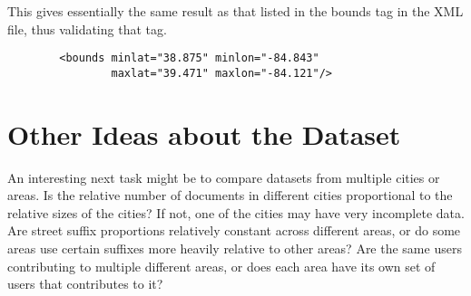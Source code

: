 \documentclass{article}
\begin{document}
        This gives essentially the same result as that listed in the bounds tag
        in the XML file, thus validating that tag.

        \begin{lstlisting}
        <bounds minlat="38.875" minlon="-84.843"
                maxlat="39.471" maxlon="-84.121"/>
        \end{lstlisting}

        
    \section{Other Ideas about the Dataset}
    An interesting next task might be to compare datasets from multiple cities
    or areas. Is the relative number of documents in different cities
    proportional to the relative sizes of the cities? If not, one of the cities
    may have very incomplete data. Are street suffix proportions relatively
    constant across different areas, or do some areas use certain suffixes more
    heavily relative to other areas? Are the same users contributing to multiple
    different areas, or does each area have its own set of users that
    contributes to it?
\end{document}
